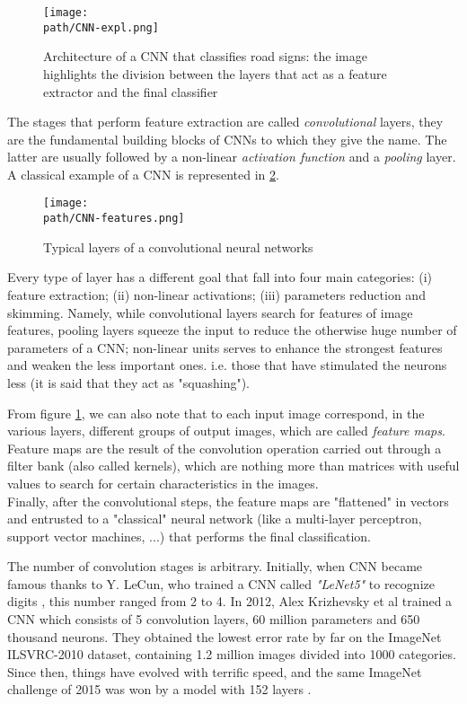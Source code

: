 \begin{figure}[h!]
 \centering
 \texttt{[image: \\path/CNN-expl.png]} 
 \caption{Architecture of a CNN that classifies road signs: the image highlights the division between the layers that act as a feature extractor and the final classifier}
 \label{fig:cnn1}
\end{figure}

The stages that perform feature extraction are called \emph{convolutional} layers, they are the fundamental building blocks of CNNs to which they give the name. The latter are usually followed by a non-linear \emph{activation function} and a \emph{pooling} layer. A classical example of a CNN is represented in \ref{fig:cnn2}.

\begin{figure}[h!]
 \centering
 \texttt{[image: \\path/CNN-features.png]} 
 \caption{Typical layers of a convolutional neural networks}
 \label{fig:cnn2}
\end{figure}


Every type of layer has a different goal that fall into four main categories: (i) feature extraction; (ii) non-linear activations; (iii) parameters reduction and skimming. Namely, while convolutional layers search for features of image features, pooling layers squeeze the input to reduce the otherwise huge number of parameters of a CNN; non-linear units serves to enhance the strongest features and weaken the less important ones. i.e. those that have stimulated the neurons less (it is said that they act as "squashing").

From figure \ref{fig:cnn1}, we can also note that to each input image correspond, in the various layers, different groups of output images, which are called \emph{feature maps}. Feature maps are the result of the convolution operation carried out through a filter bank (also called kernels), which are nothing more than matrices with useful values to search for certain characteristics in the images.
\\
Finally, after the convolutional steps, the feature maps are "flattened" in vectors and entrusted to a "classical" neural network (like a multi-layer perceptron, support vector machines, ...) that performs the final classification. 

The number of convolution stages is arbitrary. Initially, when CNN became famous thanks to Y. LeCun, who trained a CNN called \emph{"LeNet5"} to recognize digits \parencite{lenet}, this number ranged from 2 to 4. In 2012, Alex Krizhevsky et al \parencite{imagenet2012} trained a CNN which consists of 5 convolution layers, 60 million parameters and 650 thousand neurons. They obtained the lowest error rate by far on the ImageNet ILSVRC-2010 dataset, containing 1.2 million images divided into 1000 categories.
\\
Since then, things have evolved with terrific speed, and the same ImageNet challenge of 2015 was won by a model with 152 layers \parencite{resnet}. 

